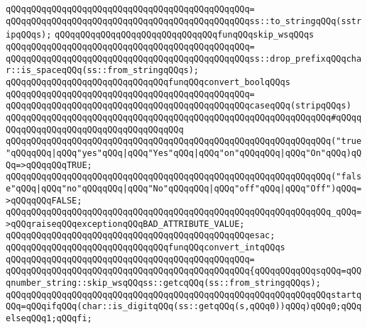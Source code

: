 \verb|qQQqqQQqqQQqqQQqqQQqqQQqqQQqqQQqqQQqqQQqqQQqqQQq=|\newline
\verb|qQQqqQQqqQQqqQQqqQQqqQQqqQQqqQQqqQQqqQQqqQQqqQQqss::to_stringqQQq(sstripqQQqs);|\newline
\newline
\verb|qQQqqQQqqQQqqQQqqQQqqQQqqQQqqQQqfunqQQqskip_wsqQQqs|\newline
\verb|qQQqqQQqqQQqqQQqqQQqqQQqqQQqqQQqqQQqqQQqqQQqqQQq=|\newline
\verb|qQQqqQQqqQQqqQQqqQQqqQQqqQQqqQQqqQQqqQQqqQQqqQQqss::drop_prefixqQQqchar::is_spaceqQQq(ss::from_stringqQQqs);|\newline
\newline
\verb|qQQqqQQqqQQqqQQqqQQqqQQqqQQqqQQqfunqQQqconvert_boolqQQqs|\newline
\verb|qQQqqQQqqQQqqQQqqQQqqQQqqQQqqQQqqQQqqQQqqQQqqQQq=|\newline
\verb|qQQqqQQqqQQqqQQqqQQqqQQqqQQqqQQqqQQqqQQqqQQqqQQqcaseqQQq(stripqQQqs)|\newline
\verb|qQQqqQQqqQQqqQQqqQQqqQQqqQQqqQQqqQQqqQQqqQQqqQQqqQQqqQQqqQQqqQQq#qQQqqQQqqQQqqQQqqQQqqQQqqQQqqQQqqQQqqQQq|\newline
\verb|qQQqqQQqqQQqqQQqqQQqqQQqqQQqqQQqqQQqqQQqqQQqqQQqqQQqqQQqqQQqqQQq("true"qQQqqQQq|\verb#|qQQq"yes"qQQq|qQQq"Yes"qQQq|qQQq"on"qQQqqQQq|qQQq"On"qQQq)qQQq=>qQQqqQQqTRUE;#\newline
\verb|qQQqqQQqqQQqqQQqqQQqqQQqqQQqqQQqqQQqqQQqqQQqqQQqqQQqqQQqqQQqqQQq("false"qQQq|\verb#|qQQq"no"qQQqqQQq|qQQq"No"qQQqqQQq|qQQq"off"qQQq|qQQq"Off")qQQq=>qQQqqQQqFALSE;#\newline
\verb|qQQqqQQqqQQqqQQqqQQqqQQqqQQqqQQqqQQqqQQqqQQqqQQqqQQqqQQqqQQqqQQq_qQQq=>qQQqraiseqQQqexceptionqQQqBAD_ATTRIBUTE_VALUE;|\newline
\verb|qQQqqQQqqQQqqQQqqQQqqQQqqQQqqQQqqQQqqQQqqQQqqQQqesac;|\newline
\newline
\verb|qQQqqQQqqQQqqQQqqQQqqQQqqQQqqQQqfunqQQqconvert_intqQQqs|\newline
\verb|qQQqqQQqqQQqqQQqqQQqqQQqqQQqqQQqqQQqqQQqqQQqqQQq=|\newline
\verb|qQQqqQQqqQQqqQQqqQQqqQQqqQQqqQQqqQQqqQQqqQQqqQQq{qQQqqQQqqQQqsqQQq=qQQqnumber_string::skip_wsqQQqss::getcqQQq(ss::from_stringqQQqs);|\newline
\verb|qQQqqQQqqQQqqQQqqQQqqQQqqQQqqQQqqQQqqQQqqQQqqQQqqQQqqQQqqQQqqQQqstartqQQq=qQQqifqQQq(char::is_digitqQQq(ss::getqQQq(s,qQQq0))qQQq)qQQq0;qQQqelseqQQq1;qQQqfi;|\newline
